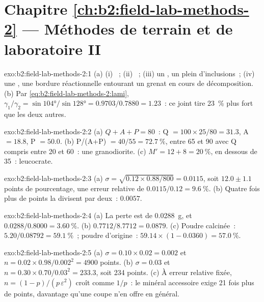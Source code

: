 \section*{Chapitre \ref{ch:b2:field-lab-methods-2} --- Méthodes de terrain et de laboratoire II}

\begin{solution}{exo:b2:field-lab-methods-2:1}
(a) (i) ~; (ii) ~; (iii) un , un  plein
d'inclusions~; (iv) une , une bordure réactionnelle entourant un grenat en cours de décomposition. (b) Par
\eqref{eq:b2:field-lab-methods-2:lami}, $\gamma_1/\gamma_2 = \sin\ang{104}/\sin\ang{128} =
0.9703/0.7880 = 1.23$~: ce joint tire \qty{23}{\percent} plus fort que les deux autres.
\end{solution}

\begin{solution}{exo:b2:field-lab-methods-2:2}
(a) $Q + A + P = 80$~: Q $= 100 \times 25/80 = 31.3$, A $= 18.8$, P $= 50.0$. (b) P/(A+P) $=
40/55 = \qty{72.7}{\percent}$, entre 65 et 90 avec Q compris entre 20 et 60~: une granodiorite.
(c) $M' = 12 + 8 = \qty{20}{\percent}$, en dessous de 35~: leucocrate.
\end{solution}

\begin{solution}{exo:b2:field-lab-methods-2:3}
(a) $\sigma = \sqrt{0.12 \times 0.88/800} = 0.0115$, soit $12.0 \pm 1.1$ points de pourcentage, une
erreur relative de $0.0115/0.12 = \qty{9.6}{\percent}$. (b) Quatre fois plus de points la divisent par deux~: $0.0057$.
\end{solution}

\begin{solution}{exo:b2:field-lab-methods-2:4}
(a) La perte est de \qty{0.0288}{g}, et $0.0288/0.8000 = \qty{3.60}{\percent}$.
(b) $0.7712/8.7712 = 0.0879$.
(c) Poudre calcinée~: $5.20/0.08792 = \qty{59.1}{\percent}$~; poudre d'origine~:
$59.14 \times (1 - 0.0360) = \qty{57.0}{\percent}$.
\end{solution}

\begin{solution}{exo:b2:field-lab-methods-2:5}
(a) $\sigma = 0.10 \times 0.02 = 0.002$ et $n = 0.02 \times 0.98/0.002^2 = 4900$ points.
(b) $\sigma = 0.03$ et $n = 0.30 \times 0.70/0.03^2 = 233.3$, soit 234 points. (c) À erreur relative
fixée, $n = (1-p)/(p\,\varepsilon^2)$ croît comme $1/p$~: le minéral accessoire exige 21 fois plus de
points, davantage qu'une coupe n'en offre en général.
\end{solution}

